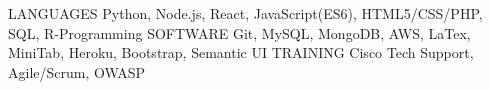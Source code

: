 \vspace{1mm}
\vspace{-5mm}

\begin{cvhonors}
  \cvhonor
    {LANGUAGES}
    {Python, Node.js, React, JavaScript(ES6), HTML5/CSS/PHP, SQL, R-Programming}
    {}
    {}
  \cvhonor
    {SOFTWARE}
    {Git, MySQL, MongoDB, AWS, LaTex, MiniTab, Heroku, Bootstrap, Semantic UI}
    {}
    {}
  \cvhonor
    {TRAINING}
    {Cisco Tech Support, Agile/Scrum, OWASP}
    {}
    {}
  
\end{cvhonors}
